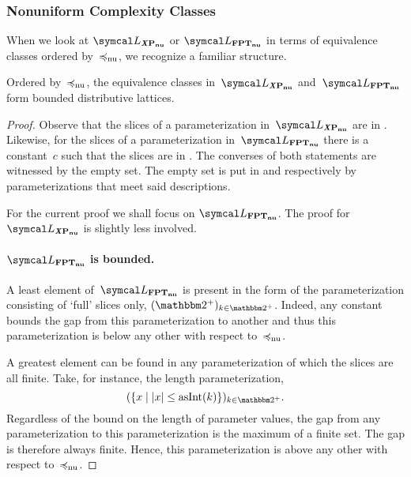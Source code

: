 \subsubsection{Nonuniform Complexity Classes}
When we look at $\calL_\clXnu{P}$ or $\calL_\clnu{FPT}$ in terms of equivalence classes ordered by~$\preccurlyeq_\mathrm{nu}$, we recognize a familiar \parencite{davey2002introduction} structure.
\begin{theorem}
\label{thm:nulattice}%
  Ordered by~$\preccurlyeq_\mathrm{nu}$, the equivalence classes in~$\calL_\clXnu{P}$ and~$\calL_\clnu{FPT}$ form bounded distributive lattices.
\end{theorem}
\begin{proof}
  Observe that the slices of a parameterization in~$\calL_\clXnu{P}$ are in .
  Likewise, for the slices of a parameterization in~$\calL_\clnu{FPT}$ there is a constant~$c$ such that the slices are in .
  The converses of both statements are witnessed by the empty set.
  The empty set is put in  and  respectively by parameterizations that meet said descriptions.

  For the current proof we shall focus on $\calL_\clnu{FPT}$.
  The proof for $\calL_\clXnu{P}$ is slightly less involved.

  \paragraph{$\calL_\clnu{FPT}$ is bounded.}
  A least element of~$\calL_\clnu{FPT}$ is present in the form of the parameterization consisting of `full' slices only, $(\binary^+)_{k \in \binary^+}$.
  Indeed, any constant bounds the gap from this parameterization to another and thus this parameterization is below any other with respect to~$\preccurlyeq_\mathrm{nu}$.

  A greatest element can be found in any parameterization of which the slices are all finite.
  Take, for instance, the length parameterization,
  \begin{equation*}
    (\{x \st \length{x} \le \asNat(k)\})_{k \in \binary^+}.
  \end{equation*}
  Regardless of the bound on the length of parameter values, the gap from any parameterization to this parameterization is the maximum of a finite set.
  The gap is therefore always finite.
  Hence, this parameterization is above any other with respect to~$\preccurlyeq_\mathrm{nu}$.


\end{proof}
